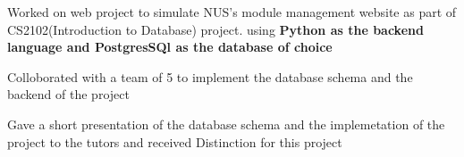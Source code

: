 \begin{cventries}
  {
    \begin{cvitems} %
      \item {Worked on web project to simulate NUS's module management website as part of CS2102(Introduction to Database) project. using \textbf{Python as the backend language and PostgresSQl as the database of choice}}
      \item {Colloborated with a team of 5 to implement the database schema and the backend of the project}
      \item {Gave a short presentation of the database schema and the implemetation of the project to the tutors and received Distinction for this project}
    \end{cvitems}
  }


\end{cventries}
